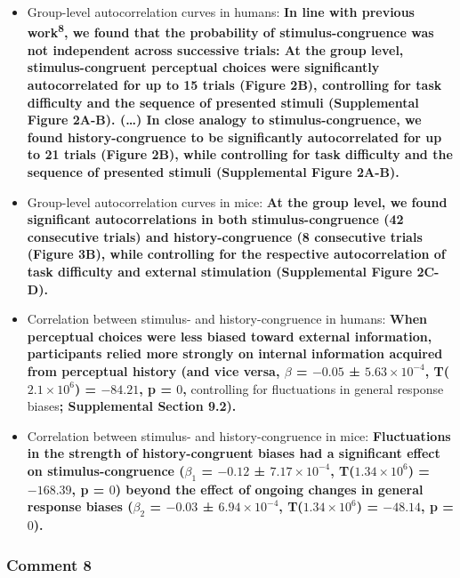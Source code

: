\documentclass[
]{article}
\begin{document}
\begin{itemize}
\item
  Group-level autocorrelation curves in humans: \textbf{In line with
  previous work\textsuperscript{8}, we found that the probability of
  stimulus-congruence was not independent across successive trials: At
  the group level, stimulus-congruent perceptual choices were
  significantly autocorrelated for up to 15 trials (Figure 2B),
  controlling for task difficulty and the sequence of presented stimuli
  (Supplemental Figure 2A-B). (\ldots) In close analogy to
  stimulus-congruence, we found history-congruence to be significantly
  autocorrelated for up to 21 trials (Figure 2B), while controlling for
  task difficulty and the sequence of presented stimuli (Supplemental
  Figure 2A-B).}
\item
  Group-level autocorrelation curves in mice: \textbf{At the group
  level, we found significant autocorrelations in both
  stimulus-congruence (42 consecutive trials) and history-congruence (8
  consecutive trials (Figure 3B), while controlling for the respective
  autocorrelation of task difficulty and external stimulation
  (Supplemental Figure 2C-D).}
\item
  Correlation between stimulus- and history-congruence in humans:
  \textbf{When perceptual choices were less biased toward external
  information, participants relied more strongly on internal information
  acquired from perceptual history (and vice versa, \(\beta\) =
  \(-0.05\) ± \(\ensuremath{5.63\times 10^{-4}}\),
  T(\(\ensuremath{2.1\times 10^{6}}\)) = \(-84.21\), p = \(0\),
  }controlling for fluctuations in general response biases\textbf{;
  Supplemental Section 9.2).}
\item
  Correlation between stimulus- and history-congruence in mice:
  \textbf{Fluctuations in the strength of history-congruent biases had a
  significant effect on stimulus-congruence (\(\beta_1\) = \(-0.12\) ±
  \(\ensuremath{7.17\times 10^{-4}}\),
  T(\(\ensuremath{1.34\times 10^{6}}\)) = \(-168.39\), p = \(0\)) beyond
  the effect of ongoing changes in general response biases (\(\beta_2\)
  = \(-0.03\) ± \(\ensuremath{6.94\times 10^{-4}}\),
  T(\(\ensuremath{1.34\times 10^{6}}\)) = \(-48.14\), p = \(0\)).}
\end{itemize}

\hypertarget{comment-8-1}{%
\subsubsection{Comment 8}\label{comment-8-1}}
\end{document}
